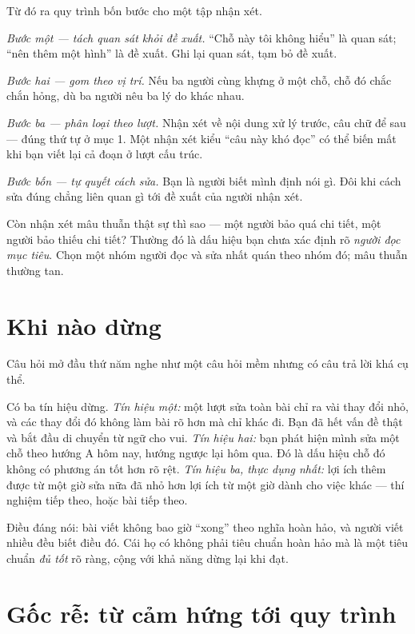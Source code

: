 \documentclass[../../english.tex]{subfiles}
\begin{document}
Từ đó ra quy trình bốn bước cho một tập nhận xét.

\emph{Bước một --- tách quan sát khỏi đề xuất.} ``Chỗ này tôi không hiểu'' là quan sát; ``nên thêm một hình'' là đề xuất. Ghi lại quan sát, tạm bỏ đề xuất.

\emph{Bước hai --- gom theo vị trí.} Nếu ba người cùng khựng ở một chỗ, chỗ đó chắc chắn hỏng, dù ba người nêu ba lý do khác nhau.

\emph{Bước ba --- phân loại theo lượt.} Nhận xét về nội dung xử lý trước, câu chữ để sau --- đúng thứ tự ở mục 1. Một nhận xét kiểu ``câu này khó đọc'' có thể biến mất khi bạn viết lại cả đoạn ở lượt cấu trúc.

\emph{Bước bốn --- tự quyết cách sửa.} Bạn là người biết mình định nói gì. Đôi khi cách sửa đúng chẳng liên quan gì tới đề xuất của người nhận xét.

Còn nhận xét mâu thuẫn thật sự thì sao --- một người bảo quá chi tiết, một người bảo thiếu chi tiết? Thường đó là dấu hiệu bạn chưa xác định rõ \emph{người đọc mục tiêu}. Chọn một nhóm người đọc và sửa nhất quán theo nhóm đó; mâu thuẫn thường tan.

\section{Khi nào dừng}

Câu hỏi mở đầu thứ năm nghe như một câu hỏi mềm nhưng có câu trả lời khá cụ thể.

Có ba tín hiệu dừng. \emph{Tín hiệu một:} một lượt sửa toàn bài chỉ ra vài thay đổi nhỏ, và các thay đổi đó không làm bài rõ hơn mà chỉ khác đi. Bạn đã hết vấn đề thật và bắt đầu di chuyển từ ngữ cho vui. \emph{Tín hiệu hai:} bạn phát hiện mình sửa một chỗ theo hướng A hôm nay, hướng ngược lại hôm qua. Đó là dấu hiệu chỗ đó không có phương án tốt hơn rõ rệt. \emph{Tín hiệu ba, thực dụng nhất:} lợi ích thêm được từ một giờ sửa nữa đã nhỏ hơn lợi ích từ một giờ dành cho việc khác --- thí nghiệm tiếp theo, hoặc bài tiếp theo.

Điều đáng nói: bài viết không bao giờ ``xong'' theo nghĩa hoàn hảo, và người viết nhiều đều biết điều đó. Cái họ có không phải tiêu chuẩn hoàn hảo mà là một tiêu chuẩn \emph{đủ tốt} rõ ràng, cộng với khả năng dừng lại khi đạt.

\section{Gốc rễ: từ cảm hứng tới quy trình}
\end{document}
